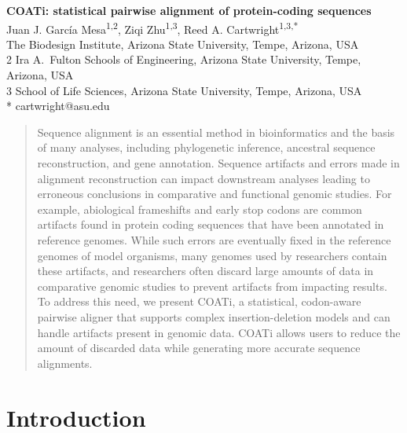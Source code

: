 \documentclass[12pt,letterpaper]{article}
\begin{document}
\begin{flushleft}
{\Large\textbf{COATi: statistical pairwise alignment of protein-coding sequences}}
\newline
\\
Juan J. García Mesa\textsuperscript{1,2},
Ziqi Zhu\textsuperscript{1,3},
Reed A. Cartwright\textsuperscript{1,3,*}\\
 The Biodesign Institute, Arizona State University, Tempe, Arizona, USA\\
2 Ira A.\ Fulton Schools of Engineering, Arizona State University, Tempe, Arizona, USA\\
3 School of Life Sciences, Arizona State University, Tempe, Arizona, USA\\
\bigskip
* cartwright@asu.edu

\end{flushleft}

\begin{abstract}
\noindent
Sequence alignment is an essential method in bioinformatics and the basis of many analyses, including phylogenetic inference, ancestral sequence reconstruction, and gene annotation. Sequence artifacts and errors made in alignment reconstruction can impact downstream analyses leading to erroneous conclusions in comparative and functional genomic studies. For example, abiological frameshifts and early stop codons are common artifacts found in protein coding sequences that have been annotated in reference genomes. While such errors are eventually fixed in the reference genomes of model organisms, many genomes used by researchers contain these artifacts, and researchers often discard large amounts of data in comparative genomic studies to prevent artifacts from impacting results. To address this need, we present COATi, a statistical, codon-aware pairwise aligner that supports complex insertion-deletion models and can handle artifacts present in genomic data. COATi allows users to reduce the amount of discarded data while generating more accurate sequence alignments.
\end{abstract}

\linenumbers

\section*{Introduction}
\end{document}
